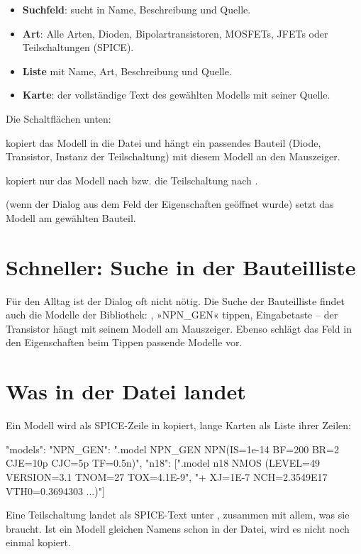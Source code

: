 \begin{itemize}
  \item \textbf{Suchfeld}: sucht in Name, Beschreibung und Quelle.
  \item \textbf{Art}: Alle Arten, Dioden, Bipolartransistoren, MOSFETs,
    JFETs oder Teilschaltungen (SPICE).
  \item \textbf{Liste} mit Name, Art, Beschreibung und Quelle.
  \item \textbf{Karte}: der vollständige Text des gewählten Modells mit
    seiner Quelle.
\end{itemize}

Die Schaltflächen unten:
\begin{description}[leftmargin=2em]
  \item[Im Plan platzieren] kopiert das Modell in die Datei und hängt ein
    passendes Bauteil (Diode, Transistor, Instanz der Teilschaltung) mit
    diesem Modell an den Mauszeiger.
  \item[In die Datei übernehmen] kopiert nur das Modell nach
     bzw. die Teilschaltung nach .
  \item[Verwenden] (wenn der Dialog aus dem Feld  der
    Eigenschaften geöffnet wurde) setzt das Modell am gewählten Bauteil.
\end{description}

\section{Schneller: Suche in der Bauteilliste}

Für den Alltag ist der Dialog oft nicht nötig. Die Suche der Bauteilliste
findet auch die Modelle der Bibliothek: , »NPN\_GEN« tippen,
Eingabetaste – der Transistor hängt mit seinem Modell am Mauszeiger. Ebenso
schlägt das Feld  in den Eigenschaften beim Tippen passende
Modelle vor.

\section{Was in der Datei landet}

Ein Modell wird als SPICE-Zeile in  kopiert, lange Karten als
Liste ihrer Zeilen:

\begin{json}
"models": {
  "NPN_GEN": ".model NPN_GEN NPN(IS=1e-14 BF=200 BR=2 CJE=10p CJC=5p TF=0.5n)",
  "n18": [".model n18 NMOS (LEVEL=49 VERSION=3.1 TNOM=27 TOX=4.1E-9",
          "+ XJ=1E-7 NCH=2.3549E17 VTH0=0.3694303 ...)"]
}
\end{json}

Eine Teilschaltung landet als SPICE-Text unter ,
zusammen mit allem, was sie braucht. Ist ein Modell gleichen Namens schon in
der Datei, wird es nicht noch einmal kopiert.
